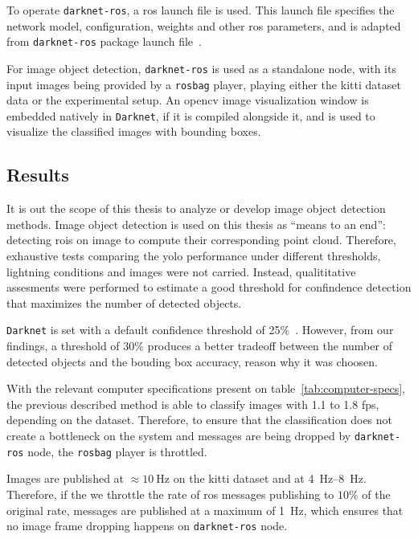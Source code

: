 To operate \texttt{darknet-ros}, a \ac{ros} launch file is used. This launch file specifies the network model, configuration, weights and other \ac{ros} parameters, and is adapted from \texttt{darknet-ros} package launch file~\cite{MarkoBjelonic}. 

For image object detection, \texttt{darknet-ros} is used as a standalone node, with its input images being provided by a \texttt{rosbag} player, playing either the \ac{kitti} dataset data or the experimental setup. An \ac{opencv} image visualization window is embedded natively in \texttt{Darknet}, if it is compiled alongside it, and is used to visualize the classified images with bounding boxes.


\subsection{Results}
It is out the scope of this thesis to analyze or develop image object detection methods. Image object detection is used on this thesis as ``means to an end'': detecting \acp{roi} on image to compute their corresponding point cloud. Therefore,  exhaustive tests comparing the \ac{yolo} performance under different thresholds, lightning conditions and images were not carried. Instead, qualititative assesments were performed to estimate a good threshold for confindence detection that maximizes the number of detected objects.

\texttt{Darknet} is set with a default confidence threshold of 25\%~\cite{Redmon2016}. However, from our findings, a threshold of 30\% produces a better tradeoff between the number of detected objects and the bouding box accuracy, reason why it was choosen.

With the relevant computer specifications present on table~\ref{tab:computer-specs}, the previous described method is able to classify images with 1.1 to 1.8 \ac{fps}, depending on the dataset. Therefore, to ensure that the classification does not create a bottleneck on the system and messages are being dropped by \texttt{darknet-ros} node, the \texttt{rosbag} player is throttled.

Images are published at $\approx\SI{10}{\hertz}$ on the \ac{kitti} dataset and at \SIrange[range-units=single]{4}{8}{\hertz}. Therefore, if the we throttle the rate of \ac{ros} messages publishing to $10\%$ of the original rate, messages are published at a maximum of \SI{1}{\hertz}, which ensures that no image frame dropping happens on \texttt{darknet-ros} node.

